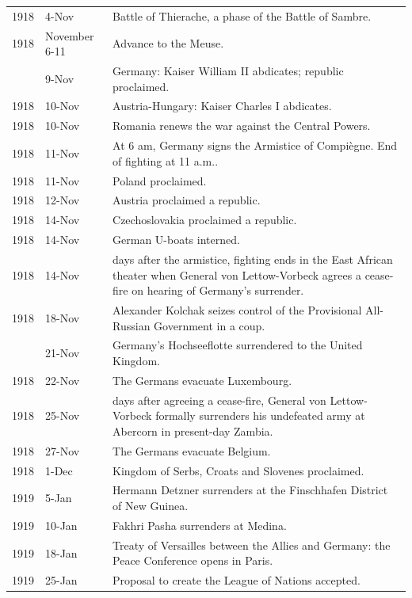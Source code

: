 \documentclass[
  openany]{book}
\begin{document}
\begin{longtable}[t]{rl>{\raggedright\arraybackslash}p{22em}}
1918 & 4-Nov & Battle of Thierache, a phase of the Battle of Sambre.\\
\rowcolor{gray!6}  1918 & November 6-11 & Advance to the Meuse.\\
\addlinespace
1918 & 9-Nov & Germany: Kaiser William II abdicates; republic proclaimed.\\
\rowcolor{gray!6}  1918 & 10-Nov & Austria-Hungary: Kaiser Charles I abdicates.\\
1918 & 10-Nov & Romania renews the war against the Central Powers.\\
\rowcolor{gray!6}  1918 & 11-Nov & At 6 am, Germany signs the Armistice of Compiègne. End of fighting at 11 a.m..\\
1918 & 11-Nov & Poland proclaimed.\\
\addlinespace
\rowcolor{gray!6}  1918 & 12-Nov & Austria proclaimed a republic.\\
1918 & 14-Nov & Czechoslovakia proclaimed a republic.\\
\rowcolor{gray!6}  1918 & 14-Nov & German U-boats interned.\\
1918 & 14-Nov & 3 days after the armistice, fighting ends in the East African theater when General von Lettow-Vorbeck agrees a cease-fire on hearing of Germany's surrender.\\
\rowcolor{gray!6}  1918 & 18-Nov & Alexander Kolchak seizes control of the Provisional All-Russian Government in a coup.\\
\addlinespace
1918 & 21-Nov & Germany's Hochseeflotte surrendered to the United Kingdom.\\
\rowcolor{gray!6}  1918 & 22-Nov & The Germans evacuate Luxembourg.\\
1918 & 25-Nov & 11 days after agreeing a cease-fire, General von Lettow-Vorbeck formally surrenders his undefeated army at Abercorn in present-day Zambia.\\
\rowcolor{gray!6}  1918 & 27-Nov & The Germans evacuate Belgium.\\
1918 & 1-Dec & Kingdom of Serbs, Croats and Slovenes proclaimed.\\
\addlinespace
\rowcolor{gray!6}  1919 & 5-Jan & Hermann Detzner surrenders at the Finschhafen District of New Guinea.\\
1919 & 10-Jan & Fakhri Pasha surrenders at Medina.\\
\rowcolor{gray!6}  1919 & 18-Jan & Treaty of Versailles between the Allies and Germany: the Peace Conference opens in Paris.\\
1919 & 25-Jan & Proposal to create the League of Nations accepted.\\

\end{longtable}
\end{document}
